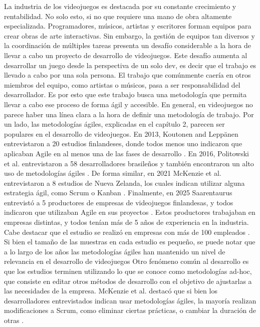 
\par La industria de los videojuegos es destacada por su constante crecimiento y rentabilidad. No solo esto, si no que requiere una mano de obra altamente especializada. Programadores, músicos, artistas y escritores forman equipos para crear obras de arte interactivas. Sin embargo, la gestión de equipos tan diversos y la coordinación de múltiples tareas presenta un desafío considerable a la hora de llevar a cabo un proyecto de desarrollo de videojuegos.
\bigbreak
Este desafío aumenta al desarrollar un juego desde la perspectiva de un solo dev, es decir que el trabajo es llevado a cabo por una sola persona. El trabajo que comúnmente caería en otros miembros del equipo, como artistas o músicos, pasa a ser responsabilidad del desarrollador. Es por esto que este trabajo busca una metodología que permita llevar a cabo ese proceso de forma ágil y accesible.
\bigbreak
En general, en videojuegos no parece haber una línea clara a la hora de definir una metodología de trabajo. Por un lado, las metodologías ágiles, explicadas en el capítulo 2, parecen ser populares en el desarrollo de videojuegos. En 2013, Koutonen and Leppänen entrevistaron a 20 estudios finlandeses, donde todos menos uno indicaron que aplicaban Agile en al menos una de las fases de desarrollo \cite{koutonenHowAreAgile2013}.
En 2016, Politowski et al. entrevistaron a 58 desarrolladores brasileños y también encontraron un alto uso de metodologías ágiles \cite{politowskiSoftwareEngineeringProcesses2016}.
De forma similar, en 2021 McKenzie et al. entrevistaron a 8 estudios de Nueva Zelanda, los cuales indican utilizar alguna estrategia ágil, como Scrum o Kanban \cite{mckenzieAgileNotAgile2021}.
Finalmente, en 2025 Saarentaurus entrevistó a 5 productores de empresas de videojuegos finlandesas, y todos indicaron que utilizaban Agile en sus proyectos \cite{saarentausAgileScrumMethods2025}.
Estos productores trabajaban en empresas distintas, y todos tenían más de 5 años de experiencia en la industria. Cabe destacar que el estudio se realizó en empresas con más de 100 empleados \cite{saarentausAgileScrumMethods2025}.
\break
Si bien el tamaño de las muestras en cada estudio es pequeño, se puede notar que a lo largo de los años las metodologías ágiles han mantenido un nivel de relevancia en el desarrollo de videojuegos
\bigbreak
Otro fenómeno común al desarrollo es que los estudios terminen utilizando lo que se conoce como metodologías ad-hoc, que consiste en editar otros métodos de desarrollo con el objetivo de ajustarlas a las necesidades de la empresa. McKenzie et al. destacó que si bien los desarrolladores entrevistados indican usar metodologías ágiles, la mayoría realizan modificaciones a Scrum, como eliminar ciertas prácticas, o cambiar la duración de otras \cite{mckenzieAgileNotAgile2021}.
